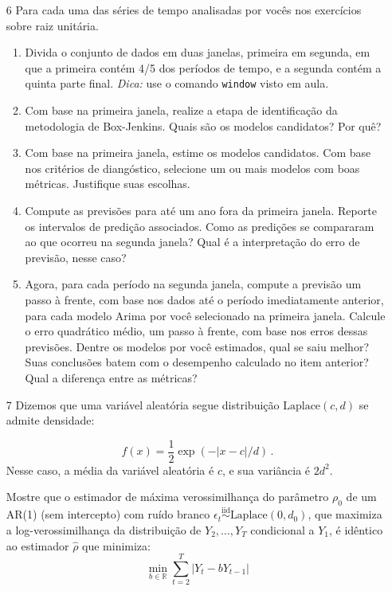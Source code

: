 \documentclass[10pt,a4paper]{article}
\begin{document}
\begin{enumerate}
\item[6] Para cada uma das séries de tempo analisadas por vocês nos exercícios sobre raiz unitária.
\begin{enumerate}
	\item Divida o conjunto de dados em duas janelas, primeira em segunda, em que a primeira contém 4/5 dos períodos de tempo, e a segunda contém a quinta parte final. \textit{Dica:} use o comando \texttt{window} visto em aula.
	\item Com base na primeira janela, realize a etapa de identificação da metodologia de Box-Jenkins. Quais são os modelos candidatos? Por quê?
	\item Com base na primeira janela, estime os modelos candidatos. Com base nos critérios de diangóstico, selecione um ou mais modelos com boas métricas. Justifique suas escolhas.
	\item Compute as previsões para até um ano fora da primeira janela. Reporte os intervalos de predição associados. Como as predições se compararam ao que ocorreu na segunda janela? Qual é a interpretação do erro de previsão, nesse caso?
	\item Agora, para cada período na segunda janela, compute a previsão um passo à frente, com base nos dados até o período imediatamente anterior, para cada modelo Arima por você selecionado na primeira janela. Calcule o erro quadrático médio, um passo à frente, com base nos erros dessas previsões. Dentre os modelos por você estimados, qual se saiu melhor? Suas conclusões batem com o desempenho calculado no item anterior? Qual a diferença entre as métricas?
\end{enumerate}


		\item[7] Dizemos que uma variável aleatória segue distribuição $\text{Laplace}(c,d)$ se admite densidade:

	$$f(x) = \frac{1}{2}\exp(-|x-c|/d) \, .$$
	Nesse caso, a média da variável aleatória é $c$, e sua variância é $2d^2$.

	 Mostre que o estimador de máxima verossimilhança do parâmetro $\rho_0$ de um AR(1) (sem intercepto) com ruído branco $\epsilon_t \overset{\text{iid}}{\sim}\text{Laplace}(0,d_0)$, que maximiza a log-verossimilhança da distribuição de $Y_2,\ldots, Y_T$ condicional a $Y_1$, é idêntico ao estimador $\hat \rho$ que minimiza:
	$$\min_{b \in \mathbb{R}}\sum_{t=2}^T |Y_t - b Y_{t-1}|$$
\end{enumerate}
\end{document}

